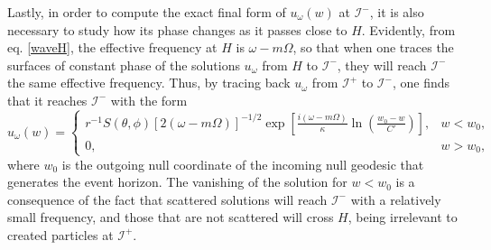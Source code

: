 \documentclass[
12pt,		%
openright,	%
twoside,  %
a4paper,			%
chapter=TITLE,		%
english,			%
french,				%
spanish,			%
brazil				%
]{USPSC-classe/USPSC}
\begin{document}
Lastly, in order to compute the exact final form of $u_{\omega}(w)$ at $\mathscr{I}^-$, it is also necessary to study how its phase changes as it passes close to $H$. Evidently, from eq. \ref{waveH}, the effective frequency at $H$ is $\omega-m\Omega$, so that when one traces the surfaces of constant phase of the solutions $u_{\omega}$ from $H$ to $\mathscr{I}^-$, they will reach $\mathscr{I}^-$ the same effective frequency. Thus, by tracing back $u_{\omega}$ from $\mathscr{I}^+$ to $\mathscr{I}^-$, one finds that it reaches $\mathscr{I}^-$ with the form
\begin{equation}\label{wave1}
    u_{\omega}(w)=
     \begin{cases}
      r^{-1}S(\theta,\phi)\left[2(\omega-m\Omega)\right]^{-1/2}\exp\left[{\frac{i(\omega-m\Omega)}{\kappa}\ln\left({\frac{w_0-w}{C'}}\right)}\right], & w<w_0,\\
      0, & w>w_0, 
    \end{cases}
\end{equation}
where $w_0$ is the outgoing null coordinate of the incoming null geodesic that generates the event horizon. The vanishing of the solution for $w<w_0$ is a consequence of the fact that scattered solutions will reach $\mathscr{I}^-$ with a relatively small frequency, and those that are not scattered will cross $H$, being irrelevant to created particles at $\mathscr{I}^+$.
  
\end{document}
